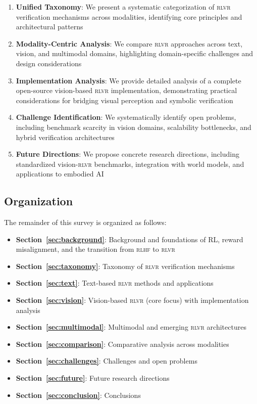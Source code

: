 \documentclass[11pt,a4paper]{article}
\newcommand{\rlvr}{\textsc{rlvr}}
\newcommand{\rlhf}{\textsc{rlhf}}
\begin{document}
\begin{enumerate}[leftmargin=*]
    \item \textbf{Unified Taxonomy}: We present a systematic categorization of \rlvr{} verification mechanisms across modalities, identifying core principles and architectural patterns
    
    \item \textbf{Modality-Centric Analysis}: We compare \rlvr{} approaches across text, vision, and multimodal domains, highlighting domain-specific challenges and design considerations
    
    \item \textbf{Implementation Analysis}: We provide detailed analysis of a complete open-source vision-based \rlvr{} implementation, demonstrating practical considerations for bridging visual perception and symbolic verification
    
    \item \textbf{Challenge Identification}: We systematically identify open problems, including benchmark scarcity in vision domains, scalability bottlenecks, and hybrid verification architectures
    
    \item \textbf{Future Directions}: We propose concrete research directions, including standardized vision-\rlvr{} benchmarks, integration with world models, and applications to embodied AI
\end{enumerate}

\subsection{Organization}
\label{sec:organization}

The remainder of this survey is organized as follows:

\begin{itemize}[leftmargin=*]
    \item \textbf{Section~\ref{sec:background}}: Background and foundations of RL, reward misalignment, and the transition from \rlhf{} to \rlvr{}
    \item \textbf{Section~\ref{sec:taxonomy}}: Taxonomy of \rlvr{} verification mechanisms
    \item \textbf{Section~\ref{sec:text}}: Text-based \rlvr{} methods and applications
    \item \textbf{Section~\ref{sec:vision}}: Vision-based \rlvr{} (core focus) with implementation analysis
    \item \textbf{Section~\ref{sec:multimodal}}: Multimodal and emerging \rlvr{} architectures
    \item \textbf{Section~\ref{sec:comparison}}: Comparative analysis across modalities
    \item \textbf{Section~\ref{sec:challenges}}: Challenges and open problems
    \item \textbf{Section~\ref{sec:future}}: Future research directions
    \item \textbf{Section~\ref{sec:conclusion}}: Conclusions
\end{itemize}
\end{document}
